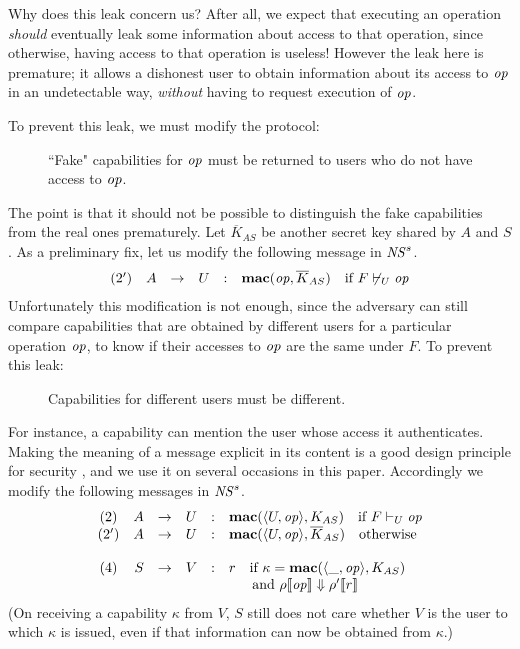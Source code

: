 \documentclass[10pt]{article}
\makeatletter
\newcounter{Crules}
\newcommand{\func}[1]{{\bf #1}}
\newcommand{\op}{{\it op}}
\newcommand{\tup}[1]{\langle #1\rangle}
\newcommand{\R}{\addtocounter{Crules}{1}R\arabic{Crules}\gdef\@currentlabel{\arabic{Crules}}}
\makeatother
\begin{document}
Why does this leak concern us? After all, we expect that executing an operation \emph{should} eventually leak some information about access to that operation, since otherwise, having access to that operation is useless! However the leak here is premature; it allows a dishonest user to obtain information about its access to $\op$ in an undetectable way, \emph{without} having to request execution of $\op$.

To prevent this leak, we must modify the protocol:
\begin{description}
\item[\R]\label{Rfake} ``Fake" capabilities for $\op$ must be returned to users who do not have access to $\op$. 
\end{description}
The point is that it should not be possible to distinguish the fake capabilities from the real ones prematurely. Let $\overline K_{AS}$ be another secret key shared by $A$ and $S$. As a preliminary fix, let us modify the following message in ${\it NS}^s$. 
\[
\left.
\begin{array}{crclcl}
 (2') & A & \rightarrow  & U & : & \func{mac}(\op,\overline K_{AS})~~\mbox{ if }F \not\vdash_U \op 
\end{array}
\right.
\]
Unfortunately this modification is not enough, since the adversary can still compare capabilities that are obtained by different users for a particular operation $\op$, to know if their accesses to $\op$ are the same under $F$. To prevent this leak:\begin{description}
\item[\R]\label{Rdiff} Capabilities for different users must be different.
\end{description}
For instance, a capability can mention the user whose access it authenticates.
Making the meaning of a message explicit in its content is a good design principle for security \cite{Abadi96}, and we use it on several occasions in this paper. Accordingly we modify the following messages in ${\it NS}^s$. \[
\left.
\begin{array}{crclcl}
 (2) & A & \rightarrow  & U & : & \func{mac}(\tup{U,\op},K_{AS})~~\mbox{ if }F \vdash_U \op \\
 (2') & A & \rightarrow  & U & : & \func{mac}(\tup{U,\op},\overline K_{AS})~~\mbox{ otherwise }\\
 \\
 (4) & S & \rightarrow  & V & : & r~~\mbox{ if }\kappa = \func{mac}(\tup{\_,\op},K_{AS}) \\
  &&&&&~~~~\mbox{ and }\rho\llbracket\op\rrbracket \Downarrow \rho'\llbracket r\rrbracket 
\end{array}
\right.
\]
(On receiving a capability $\kappa$ from $V$, $S$ still does not care whether $V$ is the user to which $\kappa$ is issued, even if that information can now be obtained from $\kappa$.)
\end{document}
